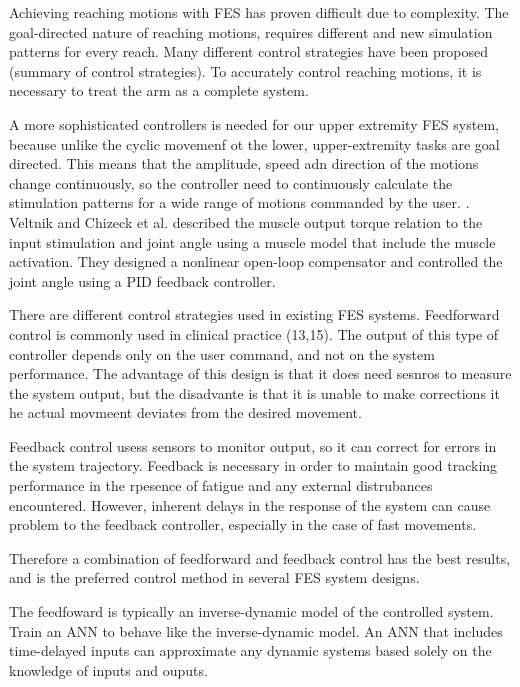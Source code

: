 Achieving reaching motions with FES has proven difficult due to complexity. The goal-directed nature of reaching motions, requires different and new simulation patterns for every reach. Many different control strategies have been proposed (summary of control strategies). To accurately control reaching motions, it is necessary to treat the arm as a complete system. 




A more sophisticated controllers is needed for our upper extremity FES system, because unlike the cyclic movemenf ot the lower, upper-extremity tasks are goal directed. This means that the amplitude, speed adn direction of the motions change continuously, so the controller need to continuously calculate the stimulation patterns for a wide range of motions commanded by the user. \cite{CFF}. 
Veltnik and Chizeck et al. described the muscle output torque relation to the input stimulation and joint angle using a muscle model that include the muscle activation. They designed a nonlinear open-loop compensator and controlled the joint angle using a PID feedback controller. \cite{NNPID}



There are different control strategies used in existing FES systems. Feedforward control is commonly used in clinical practice (13,15). The output of this type of controller depends only on the user command, and not on the system performance. The advantage of this design is that it does need sesnros to measure the system output, but the disadvante is that it is unable to make corrections it he actual movmeent deviates from the desired movement. \cite{CFF}

Feedback control usess sensors to monitor output, so it can correct for errors in the system trajectory. Feedback is necessary in order to maintain good tracking performance in the rpesence of fatigue and any external distrubances encountered. However, inherent delays in the response of the system can cause problem to the feedback controller, especially in the case of fast movements. \cite{CFF}

Therefore a combination of feedforward and feedback control has the best results, and is the preferred control method in several FES system designs. 

The feedfoward is typically an inverse-dynamic model of the controlled system. Train an ANN to behave like the inverse-dynamic model. An ANN that includes time-delayed inputs can approximate any dynamic systems based solely on the knowledge of inputs and ouputs.

